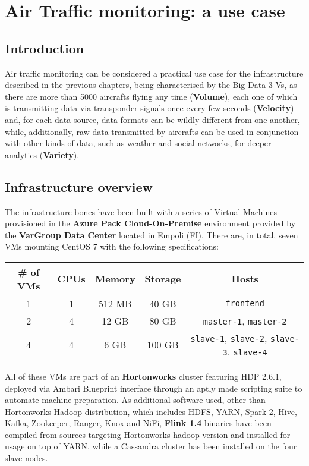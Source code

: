 \chapter{Air Traffic monitoring: a use case}

\section{Introduction}

Air traffic monitoring can be considered a practical use case for the infrastructure described in the previous chapters, being characterised by the Big Data 3 Vs, as there are more than 5000 aircrafts flying any time (\textbf{Volume}), each one of which is transmitting data via transponder signals once every few seconds (\textbf{Velocity}) and, for each data source, data formats can be wildly different from one another, while, additionally, raw data transmitted by aircrafts can be used in conjunction with other kinds of data, such as weather and social networks, for deeper analytics (\textbf{Variety}).

\section{Infrastructure overview}

The infrastructure bones have been built with a series of Virtual Machines provisioned in the \textbf{Azure Pack Cloud-On-Premise} environment provided by the \textbf{VarGroup Data Center} located in Empoli (FI). There are, in total, seven VMs mounting CentOS 7 with the following specifications:
\\    
\begin{table}[!htb]
    \centering
    \begin{tabular}{|c|c|c|c|c|}
        \hline
        \# of VMs & CPUs & Memory & Storage & Hosts \\ \hline
        1 & 1 & 512 MB & 40 GB & \texttt{frontend} \\ \hline
        2 & 4 & 12 GB & 80 GB & \texttt{master-1}, \texttt{master-2} \\ \hline
        4 & 4 & 6 GB & 100 GB & \texttt{slave-1}, \texttt{slave-2}, \texttt{slave-3}, \texttt{slave-4} \\ \hline  
    \end{tabular}
\end{table}

All of these VMs are part of an \textbf{Hortonworks} cluster featuring HDP 2.6.1, deployed via Ambari Blueprint interface through an aptly made scripting suite to automate machine preparation. As additional software used, other than Hortonworks Hadoop distribution, which includes HDFS, YARN, Spark 2, Hive, Kafka, Zookeeper, Ranger, Knox and NiFi, \textbf{Flink 1.4} binaries have been compiled from sources targeting Hortonworks hadoop version and installed for usage on top of YARN, while a Cassandra cluster has been installed on the four slave nodes.

